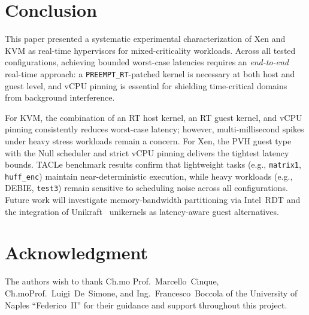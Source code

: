 \documentclass[journal]{IEEEtran}
\begin{document}





\section{Conclusion}
\label{sec:conclusion}
This paper presented a systematic experimental characterization of Xen and KVM
as real-time hypervisors for mixed-criticality workloads.
Across all tested configurations, achieving bounded worst-case latencies requires
an \emph{end-to-end} real-time approach: a \texttt{PREEMPT\_RT}-patched kernel
is necessary at both host and guest level, and vCPU pinning is essential for
shielding time-critical domains from background interference.

For KVM, the combination of an RT host kernel, an RT guest kernel, and vCPU
pinning consistently reduces worst-case latency; however, multi-millisecond
spikes under heavy stress workloads remain a concern.
For Xen, the PVH guest type with the Null scheduler and strict vCPU pinning
delivers the tightest latency bounds.
TACLe benchmark results confirm that lightweight tasks (e.g., \texttt{matrix1},
\texttt{huff\_enc}) maintain near-deterministic execution, while heavy workloads
(e.g., DEBIE, \texttt{test3}) remain sensitive to scheduling noise across all
configurations.
Future work will investigate memory-bandwidth partitioning via Intel~RDT and
the integration of Unikraft~\cite{kuenzer2021} unikernels as latency-aware
guest alternatives.


\section*{Acknowledgment}
The authors wish to thank Ch.mo Prof.\ Marcello~Cinque, Ch.moProf.\ Luigi~De~Simone,
and Ing.\ Francesco~Boccola of the University of Naples ``Federico~II''
for their guidance and support throughout this project.




\end{document}

